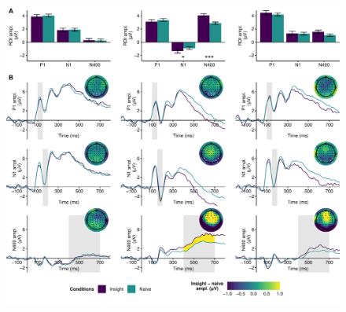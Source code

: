 \documentclass[
  english,
  man,floatsintext]{apa7}
\begin{document}
\begin{figure}

{\centering \includegraphics{manuscript_files/figure-latex/exp2-output-1} 

}

\caption{ }\label{fig:exp2-output}
\end{figure}
\end{document}
